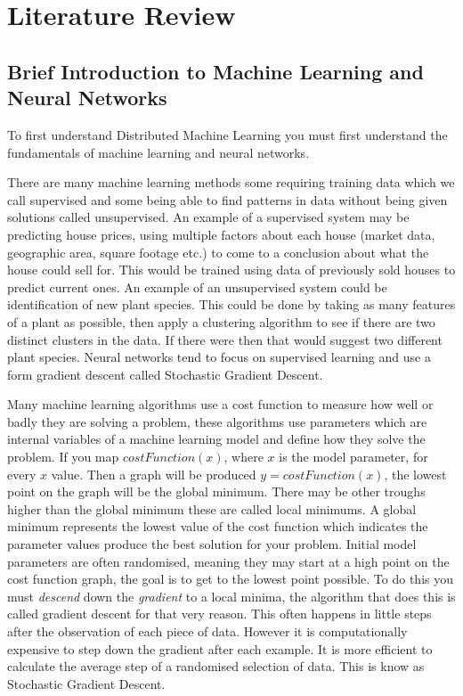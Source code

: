 \clearpage
\section{Literature Review}
\subsection{Brief Introduction to Machine Learning and Neural Networks}
To first understand Distributed Machine Learning you must first understand the
fundamentals of machine learning and neural networks. 

There are many machine learning methods some requiring training data which we
call supervised and some being able to find patterns in data without being given
solutions called unsupervised. \cite{alpaydin2020introduction} An example of a
supervised system may be predicting house prices, using multiple factors about
each house (market data, geographic area, square footage etc.) to come to a
conclusion about what the house could sell for. This would be trained using data
of previously sold houses to predict current ones. An example of an unsupervised
system could be identification of new plant species. This could be done by
taking as many features of a plant as possible, then apply a clustering
algorithm to see if there are two distinct clusters in the data. If there were
then that would suggest two different plant species. Neural networks tend to
focus on supervised learning and use a form gradient descent called Stochastic
Gradient Descent.

Many machine learning algorithms use a cost function to measure how well or
badly they are solving a problem, these algorithms use parameters which are
internal variables of a machine learning model and define how they solve the
problem. If you map \(costFunction(x)\), where \(x\) is the model parameter, for
every \(x\) value. Then a graph will be produced \(y = costFunction(x)\), the
lowest point on the graph will be the global minimum. There may be other troughs
higher than the global minimum these are called local minimums. A global minimum
represents the lowest value of the cost function which indicates the parameter
values produce the best solution for your problem. Initial model parameters are
often randomised, meaning they may start at a high point on the cost function
graph, the goal is to get to the lowest point possible. To do this you must
\textit{descend} down the \textit{gradient} to a local minima, the algorithm
that does this is called gradient descent for that very reason. This often
happens in little steps after the observation of each piece of data. However it
is computationally expensive to step down the gradient after each example. It is
more efficient to calculate the average step of a randomised selection of data.
This is know as Stochastic Gradient Descent.

